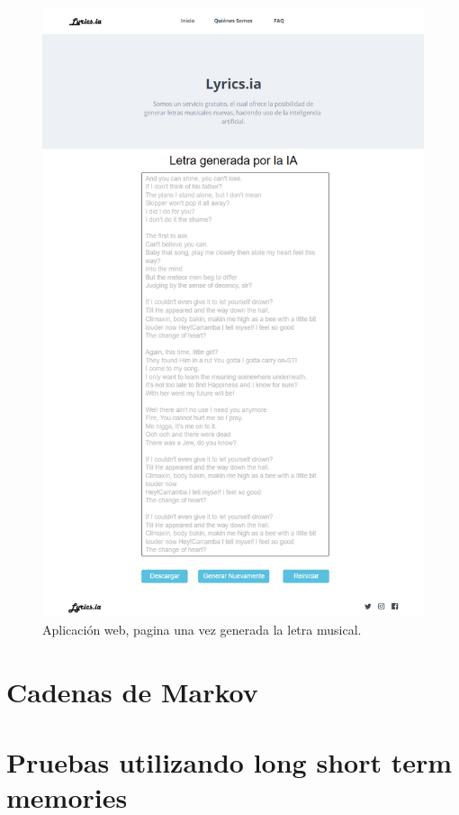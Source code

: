 \documentclass[12pt, a4paper, titlepage]{report}
\begin{document}
\begin{figure}[H] 
	\includegraphics[width=12cm]{./imagenes/Analisis/MockFrontGenerated.png}
	\centering 
	\caption{Aplicación web, pagina una vez generada la letra musical.}
\end{figure} 
\renewcommand*\appendixpagename{{\textcolor{azulescom}{Anexos}}}
\renewcommand*\appendixtocname{{\textcolor{azulescom}{Anexos}}}
\pagebreak
\appendixpageon
	\begin{appendices}
	\centering
	\section{Cadenas de Markov}
	\label{prueba2}
	\newpage
		\section{Pruebas utilizando long short term memories}
		\label{pruebaslstm}
	\newpage
	\renewcommand*\glossaryname{{\textcolor{azulescom}{Glosario}}}
	\printglossary
	\newpage
	\renewcommand*\glossaryname{{\textcolor{azulescom}{Acrónimos}}}
	\printglossary[title={\textcolor{azulescom}{Acrónimos.}}, type=\acronymtype]
\end{appendices}
\end{document}
